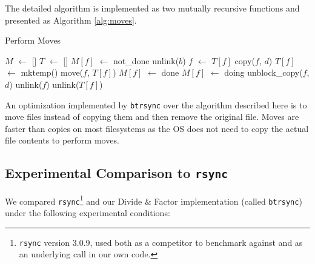 \documentclass[11pt]{llncs}
\newcommand*\Let[2]{\State #1 $\gets$ #2}
\newcommand{\btrsync}{\texttt{btrsync}\xspace}
\newcommand{\rsync}{\texttt{rsync}\xspace}
\begin{document}
The detailed algorithm is implemented as two mutually recursive functions and presented as Algorithm \ref{alg:moves}.

\begin{algorithm}
  \caption{Perform Moves}
  \label{alg:moves}
  \begin{algorithmic}[1]
    \Statex
    \Let{$M$}{[]}
    \Let{$T$}{[]}
      \Let{$M[f]$}{not\_done}
    \EndFor
          \State unlink($b$) 
        \Else
          \State {} 
        \EndIf
      \EndIf
        \Let{$f$}{$T[f]$}
      \EndIf
      \State copy($f$, $d$)
    \EndFunction
        \State \Return {}
      \EndIf
        \Let{$T[f]$}{mktemp()}
        \State move($f$, $T[f]$)
        \Let{$M[f]$}{done}
        \State \Return {}
      \EndIf
      \Let{$M[f]$}{doing}
          \State unblock\_copy($f$, $d$) 
        \EndIf
      \EndFor
        \State unlink($f$)
      \EndIf
        \State unlink($T[f]$)
      \EndIf
    \EndFunction

      \State {}
    \EndFor
  \end{algorithmic}
\end{algorithm}

An optimization implemented by \btrsync over the algorithm described here is to move files instead of copying them and then remove the original file. Moves are faster than copies on most filesystems as the OS does not need to copy the actual file contents to perform moves.

\subsection{Experimental Comparison to \rsync}

We compared \rsync\footnote{\rsync version 3.0.9, used both as a competitor to benchmark against and as an underlying call in our own code.}
and our Divide \& Factor implementation (called \btrsync) under the following experimental conditions:
\end{document}

